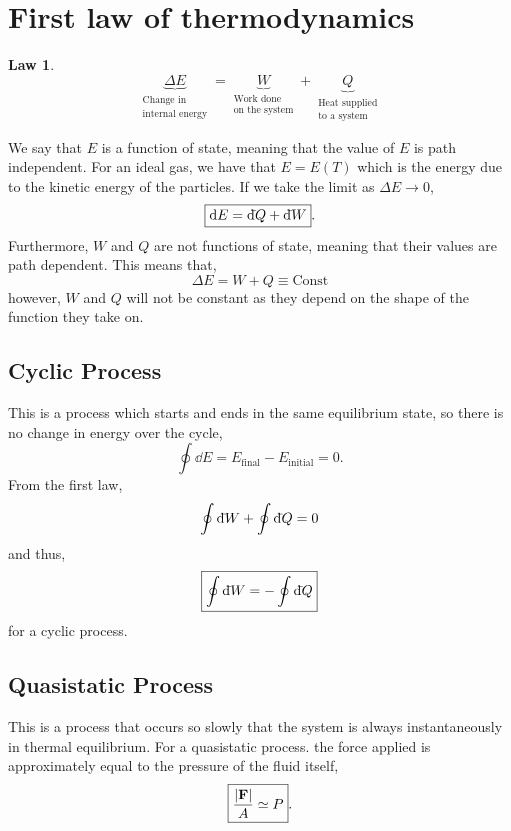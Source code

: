 \documentclass{book}
\newtheorem{law}{Law}
\newcommand{\dbar}{\mathrm{d}\hspace*{-0.08em}\bar{}\hspace*{0.1em}}
\begin{document}
\section{First law of thermodynamics}
\begin{law}
\begin{equation}
	\boxed{\underbrace{\Delta E}_{\substack{\text{Change in}\\\text{internal energy}} } = \underbrace{W}_{\substack{\text{Work done}\\\text{on the system}}} + \underbrace{Q}_{\substack{\text{Heat supplied}\\\text{to a system}}}}
\end{equation}
\end{law}
We say that $E$ is a function of state, meaning that the value of $E$ is path independent. For an ideal gas, we have that $E = E(T)$ which is the energy due to the kinetic energy of the particles. If we take the limit as $\Delta E \to 0$,
\begin{equation}
	\boxed{\dd{E} = \dbar Q + \dbar W}.
\end{equation}
Furthermore, $W$ and $Q$ are not functions of state, meaning that their values are path dependent. This means that,
\begin{equation}
	\Delta E = W + Q \equiv \text{Const}
\end{equation}
however, $W$ and $Q$ will not be constant as they depend on the shape of the function they take on.
\subsection{Cyclic Process}
This is a process which starts and ends in the same equilibrium state, so there is no change in energy over the cycle,
\begin{equation}
	\oint\dd{E} = E_{\text{final}} - E_{\text{initial}} = 0.
\end{equation}
From the first law,
\begin{equation}
	\oint \dbar{W} + \oint\dbar{Q} = 0
\end{equation}
and thus,
\begin{equation}
	\boxed{\oint\dbar{W} = -\oint \dbar{Q}}
\end{equation}
for a cyclic process.
\subsection{Quasistatic Process}
This is a process that occurs so slowly that the system is always instantaneously in thermal equilibrium. For a quasistatic process. the force applied is approximately equal to the pressure of the fluid itself,
\begin{equation}
	\boxed{\frac{\left|\vb{F}\right|}{A}\simeq P}.
\end{equation}
\end{document}
